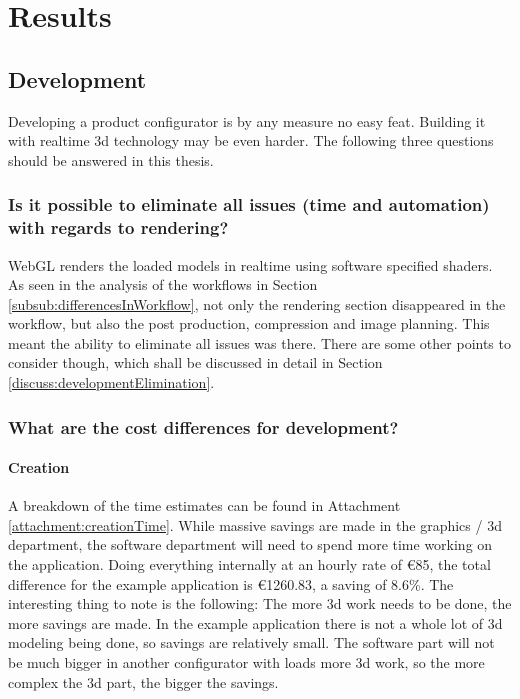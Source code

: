     
    
\chapter{Results}

\section{Development}
Developing a product configurator is by any measure no easy feat. Building it with realtime 3d technology may be even harder. The following three questions should be answered in this thesis.

\subsection {Is it possible to eliminate all issues (time and automation) with regards to rendering?}
WebGL renders the loaded models in realtime using software specified shaders. As seen in the analysis of the workflows in Section \ref{subsub:differencesInWorkflow}, not only the rendering section disappeared in the workflow, but also the post production, compression and image planning. This meant the ability to eliminate all issues was there. There are some other points to consider though, which shall be discussed in detail in Section \ref{discuss:developmentElimination}.

\subsection{What are the cost differences for development?}
\subsubsection{Creation}
A breakdown of the time estimates can be found in Attachment \ref{attachment:creationTime}. While massive savings are made in the graphics / 3d department, the software department will need to spend more time working on the application. Doing everything internally at an hourly rate of €85, the total difference for the example application is €1260.83, a saving of 8.6\%. The interesting thing to note is the following: The more 3d work needs to be done, the more savings are made. In the example application there is not a whole lot of 3d modeling being done, so savings are relatively small. The software part will not be much bigger in another configurator with loads more 3d work, so the more complex the 3d part, the bigger the savings.

